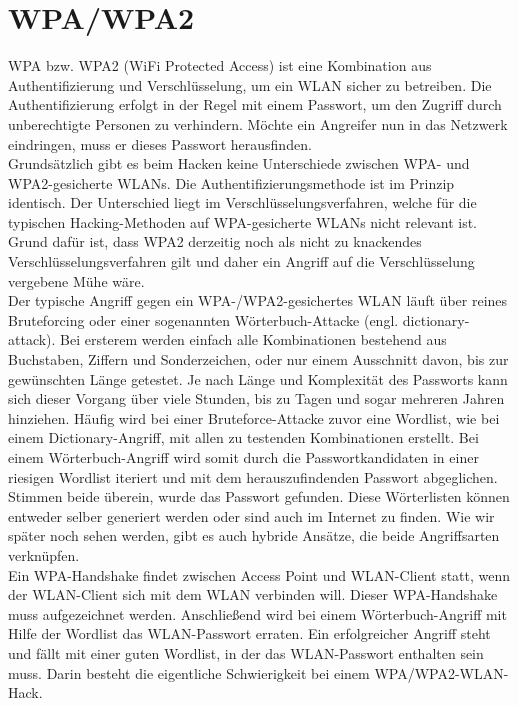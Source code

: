 \section{WPA/WPA2}


WPA bzw. WPA2 (WiFi Protected Access) ist eine Kombination aus Authentifizierung und Verschlüsselung, um ein WLAN sicher zu betreiben. Die Authentifizierung erfolgt in der Regel mit einem Passwort, um den Zugriff durch unberechtigte Personen zu verhindern. Möchte ein Angreifer nun in das Netzwerk eindringen, muss er dieses Passwort herausfinden.\\


Grundsätzlich gibt es beim Hacken keine Unterschiede zwischen WPA- und WPA2-gesicherte WLANs. Die Authentifizierungsmethode ist im Prinzip identisch. Der Unterschied liegt im Verschlüsselungsverfahren, welche für die typischen Hacking-Methoden auf WPA-gesicherte WLANs nicht relevant ist.\\ Grund dafür ist, dass WPA2 derzeitig noch als nicht zu knackendes Verschlüsselungsverfahren
gilt und daher ein Angriff auf die Verschlüsselung vergebene Mühe wäre. \\

Der typische Angriff gegen ein WPA-/WPA2-gesichertes WLAN läuft über reines Bruteforcing oder einer sogenannten Wörterbuch-Attacke (engl. dictionary-attack). Bei ersterem werden einfach alle Kombinationen bestehend aus Buchstaben, Ziffern und Sonderzeichen, oder nur einem Ausschnitt davon, bis zur gewünschten Länge getestet. Je nach Länge und Komplexität des Passworts kann sich dieser Vorgang über viele Stunden, bis zu Tagen und sogar mehreren Jahren hinziehen. Häufig wird bei einer Bruteforce-Attacke zuvor eine Wordlist, wie bei einem Dictionary-Angriff, mit allen zu testenden Kombinationen erstellt. Bei einem Wörterbuch-Angriff wird somit durch die Passwortkandidaten in einer riesigen Wordlist iteriert und mit dem herauszufindenden Passwort abgeglichen. %
Stimmen beide überein, wurde das Passwort gefunden. Diese Wörterlisten können entweder selber generiert werden oder sind auch im Internet zu finden. Wie wir später noch sehen werden, gibt es auch hybride Ansätze, die beide Angriffsarten verknüpfen.\\


Ein WPA-Handshake findet zwischen Access Point und WLAN-Client statt, wenn der WLAN-Client sich mit dem WLAN verbinden will. Dieser WPA-Handshake muss aufgezeichnet werden. Anschließend wird bei einem Wörterbuch-Angriff mit Hilfe der Wordlist das WLAN-Passwort erraten. Ein erfolgreicher Angriff steht und fällt mit einer guten Wordlist, in der das WLAN-Passwort enthalten sein muss. Darin besteht die eigentliche Schwierigkeit bei einem WPA/WPA2-WLAN-Hack.\\


